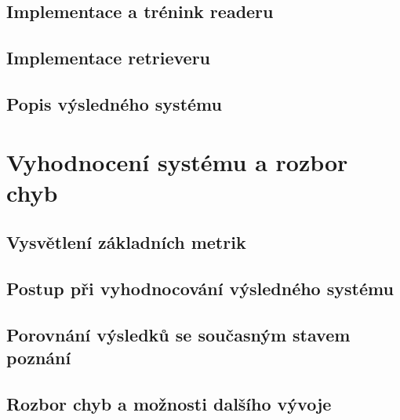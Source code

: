 \section{Implementace a trénink readeru}
\blindtext[8]

\section{Implementace retrieveru}
\blindtext[10]

\section{Popis výsledného systému}
\blindtext[8]





\chapter{Vyhodnocení systému a rozbor chyb}
\label{system_evaluation}

\blindtext[2]

\section{Vysvětlení základních metrik}
\blindtext[4]

\section{Postup při vyhodnocování výsledného systému}
\blindtext[3]

\section{Porovnání výsledků se současným stavem poznání}
\blindtext[8]

\section{Rozbor chyb a možnosti dalšího vývoje}
\blindtext[5]




